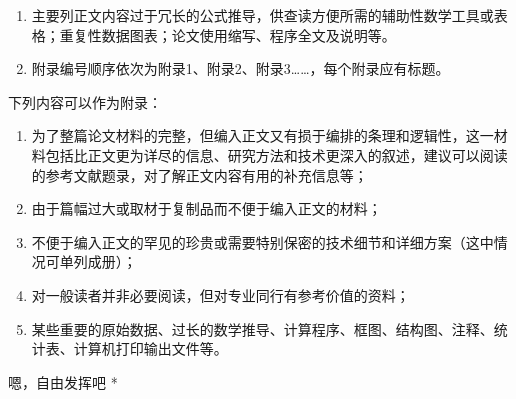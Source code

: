 \appendix
\begin{spacing}{1.3}\xiaosi %

\begin{enumerate}[label=\arabic*)]
\item 主要列正文内容过于冗长的公式推导，供查读方便所需的辅助性数学工具或表格；重复性数据图表；论文使用缩写、程序全文及说明等。

\item 附录编号顺序依次为附录1、附录2、附录3……，每个附录应有标题。
\end{enumerate}
下列内容可以作为附录：

\begin{enumerate}[label=\arabic*)]
\item 为了整篇论文材料的完整，但编入正文又有损于编排的条理和逻辑性，这一材料包括比正文更为详尽的信息、研究方法和技术更深入的叙述，建议可以阅读的参考文献题录，对了解正文内容有用的补充信息等；
\item 由于篇幅过大或取材于复制品而不便于编入正文的材料；
\item 不便于编入正文的罕见的珍贵或需要特别保密的技术细节和详细方案（这中情况可单列成册）；
\item 对一般读者并非必要阅读，但对专业同行有参考价值的资料；
\item 某些重要的原始数据、过长的数学推导、计算程序、框图、结构图、注释、统计表、计算机打印输出文件等。
\end{enumerate}

\par * 嗯，自由发挥吧 * \par

\end{spacing}